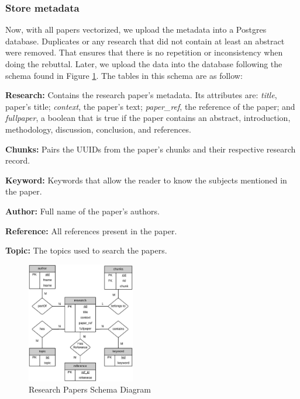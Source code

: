 \subsubsection{Store metadata}
Now, with all papers vectorized, we upload the metadata into a Postgres database. Duplicates or any research that did not contain at least an abstract were removed. That ensures that there is no repetition or inconsistency when doing the rebuttal. Later, we upload the data into the database following the schema found in Figure \ref{fig:table}. The tables in this schema are as follow:

\begin{description}
	\item{\textbf{Research:}}  Contains the research paper's metadata. Its attributes are: \textit{title}, paper's title; \textit{context}, the paper’s text; \textit{paper\_ref}, the reference of the paper; and \textit{fullpaper}, a boolean that is true if the paper contains an abstract, introduction, methodology, discussion, conclusion, and references.
	\item{\textbf{Chunks:}} Pairs the UUIDs from the paper's chunks and their respective research record.  
	\item{\textbf{Keyword:}} Keywords that allow the reader to know the subjects mentioned in the paper. 
	\item{\textbf{Author:}} Full name of the paper's authors. 
	\item{\textbf{Reference:}} All references present in the paper.
	\item{\textbf{Topic:}} The topics used to search the papers.

\end{description}

\begin{figure}[htbp]
	\begin{center}
		\includegraphics[width=0.42\textwidth]{figures/Table_diagram.jpeg} %
	\end{center}
	\caption{Research Papers Schema Diagram} %
	\label{fig:table}
\end{figure}


